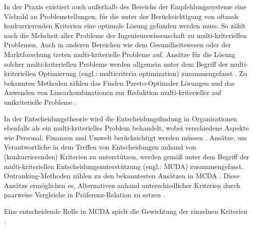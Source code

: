 In der Praxis existiert auch außerhalb des Bereichs der Empfehlungssysteme eine Vielzahl an Problemstellungen, für die unter der Berücksichtigung von oftmals konkurrierenden Kriterien eine optimale Lösung gefunden werden muss.
So zählt nach \textcite[S. ix]{statnikov:book} die Mehrheit aller Probleme der Ingenieurswissenschaft zu multi-kriteriellen Problemen.
Auch in anderen Bereichen wie dem Gesundheitswesen \cite[S. 195]{nemeth:article} oder der Marktforschung \cite[S. 50]{adomavicius:inproceedings:2} treten multi-kriterielle Probleme auf.
Ansätze für die Lösung solcher multi-kriteriellen Probleme werden allgemein unter dem Begriff der multi-kriteriellen Optimierung (engl.: multicriteria optimization) zusammengefasst \cite[S. v]{ehrgott:book}\cite[S. 867]{adomavicius:4:inbook}.
Zu bekannten Methoden zählen das Finden Pareto-Optimaler Lösungen \cite[S. 50]{adomavicius:inproceedings:2} und das Anwenden von Linearkombinationen zur Reduktion multi-kriterieller auf unikriterielle Probleme \cite[S. 745]{adomavicius:inproceedings}.

In der Entscheidungstheorie wird die Entscheidungsfindung in Organisationen ebenfalls als ein multi-kriterielles Problem behandelt, wobei verschiedene Aspekte wie Personal, Finanzen und Umwelt berücksichtigt werden müssen \cite[S. 50]{adomavicius:inproceedings:2}.
Ansätze, um Verantwortliche in dem Treffen von Entscheidungen anhand von (konkurrierenden) Kriterien zu unterstützen, werden gemäß \textcite[S. 50]{adomavicius:inproceedings:2} unter dem Begriff der multi-kriteriellen Entscheidungsunterstützung (engl.: \ac{MCDA}) zusammengefasst.
Outranking-Methoden zählen zu den bekanntesten Ansätzen in \ac{MCDA} \cite[S. 50]{adomavicius:inproceedings:2}.
Diese Ansätze ermöglichen es, Alternativen anhand unterschiedlicher Kriterien durch paarweise Vergleiche in Präferenz-Relation zu setzen \cite[S. 249]{bouyssou:inbook}.

Eine entscheidende Rolle in \ac{MCDA} spielt die Gewichtung der einzelnen Kriterien \cite[S. 206]{hdioud:inproceedings}\cite[S. 195]{nemeth:article}.


